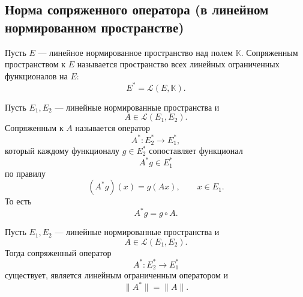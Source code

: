 \subsection{Норма сопряженного оператора (в линейном нормированном пространстве)}

\begin{definition}
	Пусть \(E\) --- линейное нормированное пространство над полем \(\mathbb{K}\).
	Сопряженным пространством к \(E\) называется пространство всех линейных ограниченных
	функционалов на \(E\):
	\[
	E^*=\mathcal{L}(E,\mathbb{K}).
	\]
\end{definition}

\begin{definition}
	Пусть \(E_1,E_2\) --- линейные нормированные пространства и
	\[
	A\in\mathcal{L}(E_1,E_2).
	\]
	Сопряженным к \(A\) называется оператор
	\[
	A^*:E_2^*\to E_1^*,
	\]
	который каждому функционалу \(g\in E_2^*\) сопоставляет функционал
	\[
	A^*g\in E_1^*
	\]
	по правилу
	\[
	(A^*g)(x)=g(Ax),
	\qquad
	x\in E_1.
	\]
	То есть
	\[
	A^*g=g\circ A.
	\]
\end{definition}


\begin{theorem}
	Пусть \(E_1,E_2\) --- линейные нормированные пространства и
	\[
	A\in\mathcal{L}(E_1,E_2).
	\]
	Тогда сопряженный оператор
	\[
	A^*:E_2^*\to E_1^*
	\]
	существует, является линейным ограниченным оператором и
	\[
	\|A^*\|=\|A\|.
	\]
\end{theorem}
